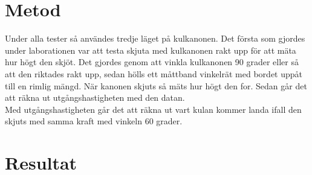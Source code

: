 \documentclass[11p]{article}
\begin{document}
    \section{Metod}
    Under alla tester så användes tredje läget på kulkanonen.
        Det första som gjordes under laborationen var att testa skjuta med kulkanonen rakt upp för att mäta hur högt den
    skjöt. Det gjordes genom att vinkla kulkanonen 90 grader eller så att den riktades rakt upp, sedan hölls ett måttband
    vinkelrät med bordet uppåt till en rimlig mängd. När kanonen skjuts så mäts hur högt den for. Sedan går det att räkna
    ut utgångshastigheten med den datan.\\
    Med utgångshastigheten går det att räkna ut vart kulan kommer landa ifall den skjuts med samma kraft med vinkeln
    60 grader. \\



    \section{Resultat}





    \printbibliography
\end{document}
